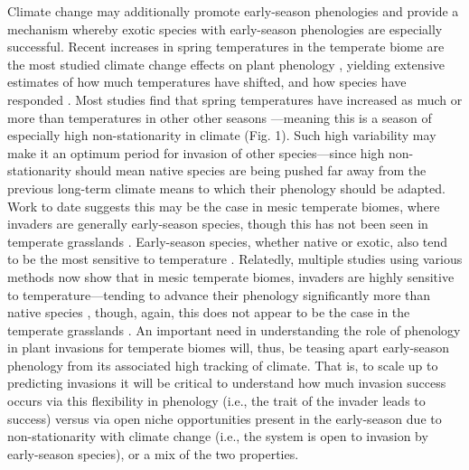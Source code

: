 \documentclass[11pt,a4paper,oneside]{article}
\begin{document}
Climate change may additionally promote early-season phenologies and provide a mechanism whereby exotic species with early-season phenologies are especially successful. Recent increases in spring temperatures in the temperate biome \citep[at least partially associated with increased in greenhouse gases, see][]{Trenberth:2007hk} are the most studied climate change effects on plant phenology \citep{Pau:2011wd}, yielding extensive estimates of how much temperatures have shifted, and how species have responded \citep{Parmesan:2003dm,Root:2003kl,Menzel:2006sq}. Most studies find that spring temperatures have increased as much or more than temperatures in other other seasons \citep{cohen2012}---meaning this is a season of especially high non-stationarity in climate (Fig. 1). Such high variability may make it an optimum period for invasion of other species---since high non-stationarity should mean native species are being pushed far away from the previous long-term climate means to which their phenology should be adapted. Work to date suggests this may be the case in mesic temperate biomes, where invaders are generally early-season species, though this has not been seen in temperate grasslands \citep{wolkovichAmBot2013}. Early-season species, whether native or exotic, also tend to be the most sensitive to temperature \citep{Cook:2012,Wolkovich:2012n}. Relatedly, multiple studies using various methods now show that in mesic temperate biomes, invaders are highly sensitive to temperature---tending to advance their phenology significantly more than native species \citep{Willis:2010al,wolkovichAmBot2013}, though, again, this does not appear to be the case in the temperate grasslands \citep{wolkovichAmBot2013}. An important need in understanding the role of phenology in plant invasions for temperate biomes will, thus, be teasing apart early-season phenology from its associated high tracking of climate. That is, to scale up to predicting invasions it will be critical to understand how much invasion success occurs via this flexibility in phenology (i.e., the trait of the invader leads to success) versus via open niche opportunities present in the early-season due to non-stationarity with climate change (i.e., the system is open to invasion by early-season species), or a mix of the two properties.\\
\\
\end{document}
